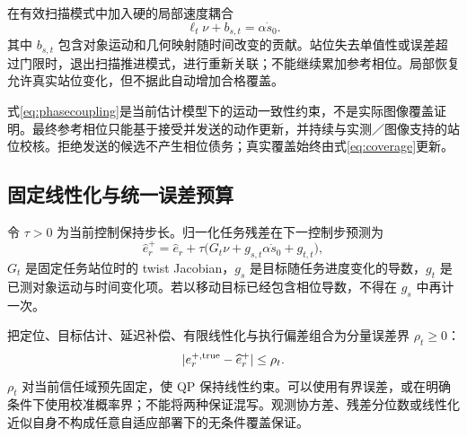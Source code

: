 \documentclass[UTF8,11pt,a4paper,fontset=fandol]{ctexart}
\numberwithin{equation}{section}
\theoremstyle{definition}
\begin{document}
在有效扫描模式中加入硬的局部速度耦合
\begin{equation}
\boxed{\ell_t\nu+b_{s,t}=\alpha\dot s_0.}
\label{eq:phasecoupling}
\end{equation}
其中 $b_{s,t}$ 包含对象运动和几何映射随时间改变的贡献。站位失去单值性或误差超过门限时，退出扫描推进模式，进行重新关联；不能继续累加参考相位。局部恢复允许真实站位变化，但不据此自动增加合格覆盖。

式\eqref{eq:phasecoupling}是当前估计模型下的运动一致性约束，不是实际图像覆盖证明。最终参考相位只能基于接受并发送的动作更新，并持续与实测／图像支持的站位校核。拒绝发送的候选不产生相位债务；真实覆盖始终由式\eqref{eq:coverage}更新。

\subsection{固定线性化与统一误差预算}
令 $\tau>0$ 为当前控制保持步长。归一化任务残差在下一控制步预测为
\begin{equation}
\widehat e_r^+
=\widehat e_r+\tau\bigl(G_t\nu+g_{s,t}\alpha\dot s_0+g_{t,t}\bigr),
\label{eq:onepred}
\end{equation}
$G_t$ 是固定任务站位时的 twist Jacobian，$g_s$ 是目标随任务进度变化的导数，$g_t$ 是已测对象运动与时间变化项。若以移动目标已经包含相位导数，不得在 $g_s$ 中再计一次。

把定位、目标估计、延迟补偿、有限线性化与执行偏差组合为分量误差界 $\rho_t\ge0$：
\begin{equation}
|e_r^{+,\rm true}-\widehat e_r^+|\le\rho_t.
\label{eq:errorbudget}
\end{equation}
$\rho_t$ 对当前信任域预先固定，使 QP 保持线性约束。可以使用有界误差，或在明确条件下使用校准概率界；不能将两种保证混写。观测协方差、残差分位数或线性化近似自身不构成任意自适应部署下的无条件覆盖保证。
\end{document}
